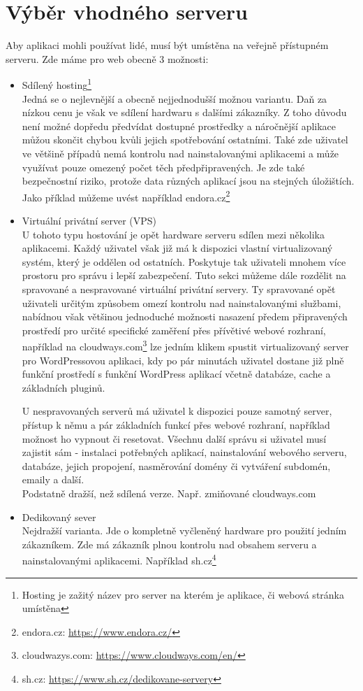 \section{Výběr vhodného serveru}
Aby aplikaci mohli používat lidé, musí být umístěna na veřejně přístupném serveru. Zde máme pro web obecně 3 možnosti:
\begin{itemize}
    \item Sdílený hosting\footnote{Hosting je zažitý název pro server na kterém je aplikace, či webová stránka umístěna}\\
    Jedná se o nejlevnější a obecně nejjednodušší možnou variantu. Daň za nízkou cenu je však ve sdílení hardwaru s dalšími zákazníky. Z toho důvodu není možné dopředu předvídat dostupné prostředky a náročnější aplikace můžou skončit chybou kvůli jejich spotřebování ostatními. Také zde uživatel ve většině případů nemá kontrolu nad nainstalovanými aplikacemi a může využívat pouze omezený počet těch předpřipravených. Je zde také bezpečnostní riziko, protože data různých aplikací jsou na stejných úložištích. Jako příklad můžeme uvést například endora.cz\footnote{endora.cz: \url{https://www.endora.cz/}}
    \item Virtuální privátní server (VPS)\\
    U tohoto typu hostování je opět hardware serveru sdílen mezi několika aplikacemi. Každý uživatel však již má k dispozici vlastní virtualizovaný systém, který je oddělen od ostatních. Poskytuje tak uživateli mnohem více prostoru pro správu i lepší zabezpečení.
    Tuto sekci můžeme dále rozdělit na spravované a nespravované virtuální privátní servery. Ty spravované opět uživateli určitým způsobem omezí kontrolu nad nainstalovanými službami, nabídnou však většinou jednoduché možnosti nasazení předem připravených prostředí pro určité specifické zaměření přes přívětivé webové rozhraní, například na cloudways.com\footnote{cloudwazys.com: \url{https://www.cloudways.com/en/}} lze jedním klikem spustit virtualizovaný server pro WordPressovou aplikaci, kdy po pár minutách uživatel dostane již plně funkční prostředí s funkční WordPress aplikací včetně databáze, cache a základních pluginů.\par
    U nespravovaných serverů má uživatel k dispozici pouze samotný server, přístup k němu a pár základních funkcí přes webové rozhraní, například možnost ho vypnout či resetovat. Všechnu další správu si uživatel musí zajistit sám - instalaci potřebných aplikací, nainstalování webového serveru, databáze, jejich propojení, nasměrování domény či vytváření subdomén, emaily a další.\\
    Podstatně dražší, než sdílená verze. Např. zmiňované cloudways.com
    \item Dedikovaný sever\\
    Nejdražší varianta. Jde o kompletně vyčleněný hardware pro použití jedním zákazníkem. Zde má zákazník plnou kontrolu nad obsahem serveru a nainstalovanými aplikacemi. Například sh.cz\footnote{sh.cz: \url{https://www.sh.cz/dedikovane-servery}}
\end{itemize}


